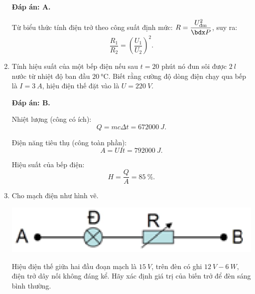 \begin{enumerate}[label=\bfseries Câu \arabic*:]
{	}
	\loigiai
	{	\textbf{Đáp án: A.}
		
		Từ biểu thức tính điện trở theo công suất định mức: $R=\dfrac{U_\text{đm}^2}{\calP}$, suy ra:
		$$\dfrac{R_1}{R_2} = \left(\dfrac{U_1}{U_2}\right)^2.$$
	}
	\item {}
	
	\cauhoi
	{Tính hiệu suất của một bếp điện nếu sau $t=20$ phút nó đun sôi được $\SI{2}{l}$ nước từ nhiệt độ ban đầu $\SI{20}{\celsius}$. Biết rằng cường độ dòng điện chạy qua bếp là $I=\SI{3}{A}$, hiệu điện thế đặt vào là $U=\SI{220}{V}$.
		
	}
	\loigiai
	{	\textbf{Đáp án: B.}
		
		Nhiệt lượng (công có ích):
		$$Q=mc \Delta t = \SI{672000}{J}.$$
		
		Điện năng tiêu thụ (công toàn phần):
		$$A=UI t = \SI{792000}{J}.$$
		
		Hiệu suất của bếp điện:
		$$H=\dfrac{Q}{A} = \SI{85}{\percent}.$$
	}
	\item {}
	
	\cauhoi
	{Cho mạch điện như hình vẽ.
		\begin{center}
			\includegraphics[scale=0.6]{../figs/VN11-2021-PH-TP017-1}
		\end{center}
	
	Hiệu điện thế giữa hai đầu đoạn mạch là $\SI{15}{V}$, trên đèn có ghi $\SI{12}{V} - \SI{6}{W}$, điện trở dây nối không đáng kể. Hãy xác định giá trị của biến trở để đèn sáng bình thường.
		
}
\end{enumerate}
